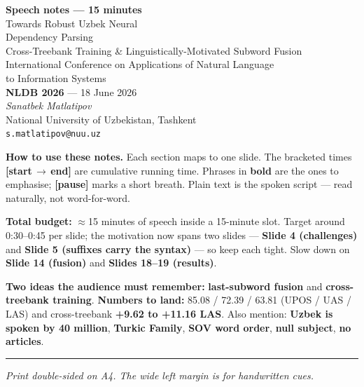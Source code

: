 \documentclass[12pt,a4paper]{article}
\begin{document}
\begin{center}
   {\LARGE\bfseries Speech notes --- 15 minutes}\\[0.6em]
   {\large Towards Robust Uzbek Neural\\Dependency Parsing}\\[0.3em]
   {\normalsize Cross-Treebank Training \& Linguistically-Motivated Subword Fusion}\\[0.6em]
   {\normalsize International Conference on Applications of Natural Language\\to Information Systems}\\
   {\normalsize \textbf{NLDB 2026} --- 18 June 2026}\\[1.2em]
   \textit{Sanatbek Matlatipov}\\
   National University of Uzbekistan, Tashkent\\
   \texttt{s.matlatipov@nuu.uz}
\end{center}

\vspace{1em}
\noindent\textbf{How to use these notes.}
Each section maps to one slide. The bracketed times
\textbf{[start\,$\to$\,end]} are cumulative running time. Phrases in
\textbf{bold} are the ones to emphasise; \textbf{[pause]} marks a short
breath. Plain text is the spoken script --- read naturally, not
word-for-word.

\vspace{0.5em}
\noindent\textbf{Total budget:} $\approx$15 minutes of speech inside a
15-minute slot. Target around 0:30--0:45 per slide; the motivation now
spans two slides --- \textbf{Slide 4 (challenges)} and \textbf{Slide 5
(suffixes carry the syntax)} --- so keep each tight. Slow down on
\textbf{Slide 14 (fusion)} and \textbf{Slides 18--19 (results)}.

\vspace{0.5em}
\noindent\textbf{Two ideas the audience must remember:}
\textbf{last-subword fusion} and \textbf{cross-treebank training}.
\textbf{Numbers to land:} 85.08 / 72.39 / 63.81 (UPOS / UAS / LAS) and
cross-treebank \textbf{+9.62 to +11.16 LAS}. Also mention: \textbf{Uzbek
is spoken by 40 million}, \textbf{Turkic Family}, \textbf{SOV word
order}, \textbf{null subject}, \textbf{no articles}.

\vfill\hrule\vspace{0.5em}
\noindent\textit{Print double-sided on A4. The wide left margin is for handwritten cues.}
\end{document}
